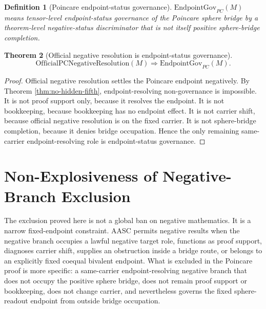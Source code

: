 \documentclass[11pt]{article}
\newtheorem{theorem}{Theorem}[section]
\newtheorem{definition}[theorem]{Definition}
\newcommand{\OfficialPCNegativeResolution}{\mathrm{OfficialPCNegativeResolution}}
\newcommand{\EndpointGov}{\mathrm{EndpointGov}_{PC}}
\begin{document}
\begin{definition}[Poincare endpoint-status governance]
\(\EndpointGov(M)\) means tensor-level endpoint-status governance of the Poincare sphere bridge by a theorem-level negative-status discriminator that is not itself positive sphere-bridge completion.
\end{definition}

\begin{theorem}[Official negative resolution is endpoint-status governance]\label{thm:official-negative-governance}
\[
\OfficialPCNegativeResolution(M)\Rightarrow\EndpointGov(M).
\]
\end{theorem}
\begin{proof}
Official negative resolution settles the Poincare endpoint negatively. By Theorem \ref{thm:no-hidden-fifth}, endpoint-resolving non-governance is impossible. It is not proof support only, because it resolves the endpoint. It is not bookkeeping, because bookkeeping has no endpoint effect. It is not carrier shift, because official negative resolution is on the fixed carrier. It is not sphere-bridge completion, because it denies bridge occupation. Hence the only remaining same-carrier endpoint-resolving role is endpoint-status governance.
\end{proof}


\section{Non-Explosiveness of Negative-Branch Exclusion}\label{sec:non-explosiveness}

The exclusion proved here is not a global ban on negative mathematics. It is a narrow fixed-endpoint constraint. AASC permits negative results when the negative branch occupies a lawful negative target role, functions as proof support, diagnoses carrier shift, supplies an obstruction inside a bridge route, or belongs to an explicitly fixed coequal bivalent endpoint. What is excluded in the Poincare proof is more specific: a same-carrier endpoint-resolving negative branch that does not occupy the positive sphere bridge, does not remain proof support or bookkeeping, does not change carrier, and nevertheless governs the fixed sphere-readout endpoint from outside bridge occupation.
\end{document}
